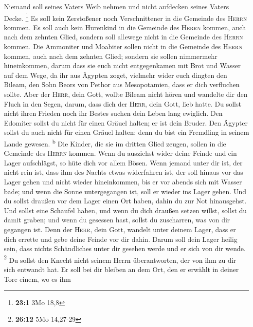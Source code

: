  Niemand soll seines Vaters Weib nehmen und nicht
aufdecken seines Vaters Decke. \footnote{\textbf{23:1} 3Mo 18,8}
 Es soll kein Zerstoßener noch Verschnittener in die
Gemeinde des \textsc{Herrn} kommen.  Es soll auch kein
Hurenkind in die Gemeinde des \textsc{Herrn} kommen, auch nach dem
zehnten Glied, sondern soll allewege nicht in die Gemeinde des
\textsc{Herrn} kommen.  Die Ammoniter und Moabiter sollen
nicht in die Gemeinde des \textsc{Herrn} kommen, auch nach dem zehnten
Glied; sondern sie sollen nimmermehr hineinkommen,  darum
dass sie euch nicht entgegenkamen mit Brot und Wasser auf dem Wege, da
ihr aus Ägypten zoget, vielmehr wider euch dingten den Bileam, den Sohn
Beors von Pethor aus Mesopotamien, dass er dich verfluchen sollte.
 Aber der \textsc{Herr}, dein Gott, wollte Bileam nicht
hören und wandelte dir den Fluch in den Segen, darum, dass dich der
\textsc{Herr}, dein Gott, lieb hatte.  Du sollst nicht
ihren Frieden noch ihr Bestes suchen dein Leben lang ewiglich.
 Den Edomiter sollst du nicht für einen Gräuel halten; er
ist dein Bruder. Den Ägypter sollst du auch nicht für einen Gräuel
halten; denn du bist ein Fremdling in seinem Lande gewesen.
\textsuperscript{b}  Die Kinder, die sie im dritten Glied
zeugen, sollen in die Gemeinde des \textsc{Herrn} kommen.
 Wenn du ausziehst wider deine Feinde und ein Lager
aufschlägst, so hüte dich vor allem Bösen.  Wenn jemand
unter dir ist, der nicht rein ist, dass ihm des Nachts etwas widerfahren
ist, der soll hinaus vor das Lager gehen und nicht wieder hineinkommen,
 bis er vor abends sich mit Wasser bade; und wenn die
Sonne untergegangen ist, soll er wieder ins Lager gehen. 
Und du sollst draußen vor dem Lager einen Ort haben, dahin du zur Not
hinausgehst.  Und sollst eine Schaufel haben, und wenn du
dich draußen setzen willst, sollst du damit graben; und wenn du gesessen
hast, sollst du zuscharren, was von dir gegangen ist. 
Denn der \textsc{Herr}, dein Gott, wandelt unter deinem Lager, dass er
dich errette und gebe deine Feinde vor dir dahin. Darum soll dein Lager
heilig sein, dass nichts Schändliches unter dir gesehen werde und er
sich von dir wende. \footnote{\textbf{26:12} 5Mo 14,27-29}
 Du sollst den Knecht nicht seinem Herrn überantworten,
der von ihm zu dir sich entwandt hat.  Er soll bei dir
bleiben an dem Ort, den er erwählt in deiner Tore einem, wo es ihm
